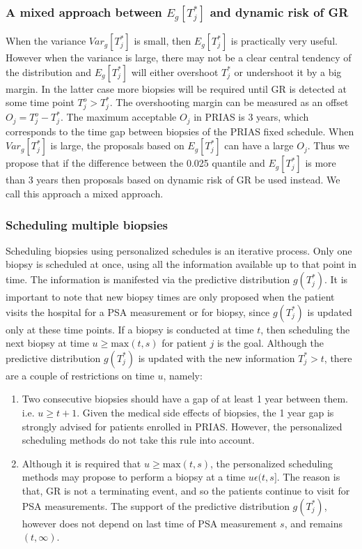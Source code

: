 \subsubsection{A mixed approach between $E_g[T^*_j]$ and dynamic risk of GR}
When the variance $Var_g[T^*_j]$ is small, then $E_g[T^*_j]$ is practically very useful. However when the variance is large, there may not be a clear central tendency of the distribution and $E_g[T^*_j]$ will either overshoot $T^*_j$ or undershoot it by a big margin. In the latter case more biopsies will be required until GR is detected at some time point $T^o_j >  T^*_j$. The overshooting margin can be measured as an offset $O_j = T^o_j - T^*_j$. The maximum acceptable $O_j$ in PRIAS is 3 years, which corresponds to the time gap between biopsies of the PRIAS fixed schedule. When $Var_g[T^*_j]$ is large, the proposals based on $E_g[T^*_j]$ can have a large $O_j$. Thus we propose that if the difference between the 0.025 quantile and $E_g[T^*_j]$ is more than 3 years then proposals based on dynamic risk of GR be used instead. We call this approach a mixed approach.

\subsubsection{Scheduling multiple biopsies}
\label{subsubsec : pers_sched_algorithm}
Scheduling biopsies using personalized schedules is an iterative process. Only one biopsy is scheduled at once, using all the information available up to that point in time. The information is manifested via the predictive distribution $g(T^*_j)$. It is important to note that new biopsy times are only proposed when the patient visits the hospital for a PSA measurement or for biopsy, since $g(T^*_j)$ is updated only at these time points. If a biopsy is conducted at time $t$, then scheduling the next biopsy at time $u \geq \text{max}(t,s)$ for patient $j$ is the goal. Although the predictive distribution $g(T^*_j)$ is updated with the new information $T^*_j > t$, there are a couple of restrictions on time $u$, namely:

\begin{enumerate}
\item Two consecutive biopsies should have a gap of at least 1 year between them. i.e. $u \geq t + 1$. Given the medical side effects of biopsies, the 1 year gap is strongly advised for patients enrolled in PRIAS. However, the personalized scheduling methods do not take this rule into account.
\item Although it is required that $u \geq \text{max}(t,s)$, the personalized scheduling methods may propose to perform a biopsy at a time $u \epsilon (t, s]$. The reason is that, GR is not a terminating event, and so the patients continue to visit for PSA measurements. The support of the predictive distribution $g(T^*_j)$, however does not depend on last time of PSA measurement $s$, and remains $(t, \infty)$.
\end{enumerate}
 
